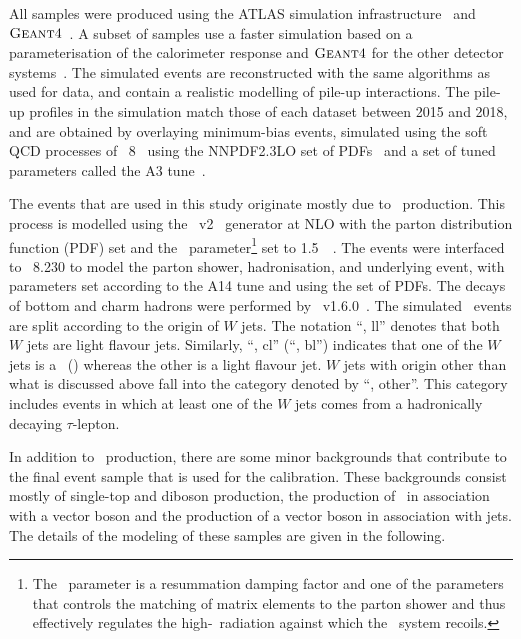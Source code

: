 All samples were 
produced using the ATLAS simulation infrastructure~\cite{SOFT-2010-01}
and $\textsc{Geant}4$~\cite{Agostinelli:2002hh}. A subset of samples use a faster 
simulation based on a parameterisation of the calorimeter response and 
$\textsc{Geant}4$ for the other detector systems~\cite{SOFT-2010-01}. %
The simulated events are reconstructed with the same algorithms as
used for data, and contain a realistic modelling of pile-up
interactions. The pile-up profiles in the simulation match those of each dataset
between 2015 and 2018, and are obtained by overlaying minimum-bias events,
simulated using the soft QCD processes of
{\PYTHIA}~8~\cite{Sjostrand:2014zea} using the NNPDF2.3LO set of
PDFs~\cite{Ball:2012cx} and a set of tuned
parameters called the A3 tune~\cite{ATL-PHYS-PUB-2016-017}.

The events that are used in this study originate mostly due to 
\ttbar\ production. This process is modelled using the
\powhegbox~v2~\cite{Frixione:2007nw,Nason:2004rx,Frixione:2007vw,Alioli:2010xd}
generator at NLO with the \nnpdfnlo %
parton distribution function (PDF) set
and the \hdamp\ parameter\footnote{The
  \hdamp\ parameter is a resummation damping factor and one of the
  parameters that controls the matching of \powheg matrix elements to
  the parton shower and thus effectively regulates the
  high-\pt\ radiation against which the \ttbar\ system recoils.} set
to 1.5~\mtop~\cite{ATL-PHYS-PUB-2016-020}.  The events were interfaced
to {\PYTHIA}~8.230 to model the parton shower,
hadronisation, and underlying event, with parameters set according
to the A14 tune and using the \nnpdftwo set of PDFs.
The decays of bottom and charm hadrons were performed by \evtgen~v1.6.0~\cite{EvtGen}.
 The simulated \ttbar\
events are split according to the origin of $W$ jets. The notation
``\ttbar, ll'' denotes that both $W$ jets are light flavour jets.
Similarly, ``\ttbar, cl'' (``\ttbar, bl'') 
indicates that one of the $W$ jets is a \cjet\ (\bjet)
whereas the other is a light flavour jet. $W$ jets with origin
other than what is discussed above fall into the 
category denoted by ``\ttbar, other''. This category includes
events in which at least one of the $W$ jets comes from a
hadronically decaying $\tau$-lepton. 

In addition to \ttbar\ production, there are some minor backgrounds
that contribute to the final event sample that is used for the calibration.
These backgrounds consist mostly of single-top and diboson production, 
the production of \ttbar\ in association with a vector boson
and the production of a vector boson in association with jets.
The details
of the modeling of these samples are given in the following.

